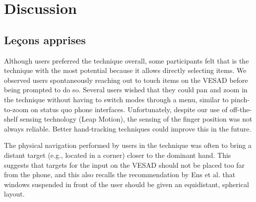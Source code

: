 \chapter{Discussion}
\label{ch:discussion}

\section{Leçons apprises}
\label{sec:discussion_lessons}

Although users preferred the  technique overall, some participants felt that  is the technique with the most potential because it allows directly selecting items. We observed users spontaneously reaching out to touch items on the VESAD before being prompted to do so. Several users wished that they could pan and zoom in the  technique without having to switch modes through a menu, similar to pinch-to-zoom on status quo phone interfaces. Unfortunately, despite our use of off-the-shelf sensing technology (Leap Motion), the sensing of the finger position was not always reliable. Better hand-tracking techniques \cite{Taylor2016} could improve this in the future.

The physical navigation performed by users in the  technique was often to bring a distant target (e.g., located in a corner) closer to the dominant hand. This suggests that targets for the input on the VESAD should not be placed too far from the phone, and this also recalls the recommendation by Ens et al. \cite{Ens2014} that windows suspended in front of the user should be given an equidistant, spherical layout.

